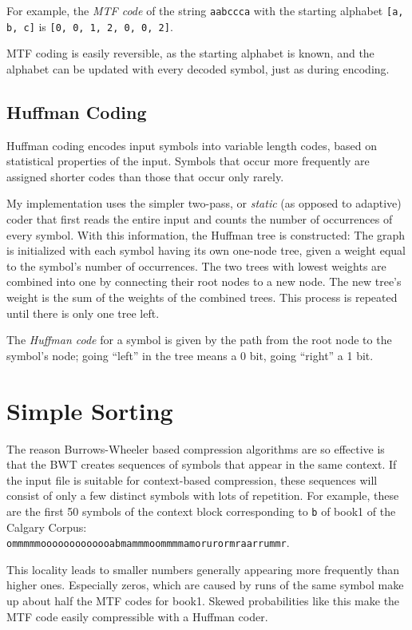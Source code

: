 \documentclass[a4paper]{scrreprt}
\begin{document}
For example, the \emph{MTF code} of the string \texttt{aabccca} with the
starting alphabet \texttt{[a, b, c]} is \texttt{[0, 0, 1, 2, 0, 0, 2]}.

MTF coding is easily reversible, as the starting alphabet is known, and the
alphabet can be updated with every decoded symbol, just as during encoding.

\section{Huffman Coding}

Huffman coding encodes input symbols into variable length codes, based on
statistical properties of the input. Symbols that occur more frequently are
assigned shorter codes than those that occur only rarely.

My implementation uses the simpler two-pass, or \emph{static} (as opposed
to adaptive) coder that first reads the entire input and counts the number of
occurrences of every symbol. With this information, the Huffman tree is
constructed: The graph is initialized with each symbol having its own one-node
tree, given a weight equal to the symbol's number of occurrences. The two trees
with lowest weights are combined into one by connecting their root nodes to a
new node. The new tree's weight is the sum of the weights of the combined trees.
This process is repeated until there is only one tree left.

The \emph{Huffman code} for a symbol is given by the path from the root node to
the symbol's node; going ``left'' in the tree means a 0 bit, going ``right'' a 1
bit.

\chapter{Simple Sorting}

The reason Burrows-Wheeler based compression algorithms are so effective is that
the BWT creates sequences of symbols that appear in the same context. If the
input file is suitable for context-based compression, these sequences will
consist of only a few distinct symbols with lots of repetition. For example,
these are the first 50 symbols of the context block corresponding to \texttt{b}
of book1 of the Calgary Corpus:\\
\texttt{ommmmmooooooooooooabmammmoommmmamorurormraarrummr}.

This locality leads to smaller numbers generally appearing more frequently than
higher ones. Especially zeros, which are caused by runs of the same symbol make
up about half the MTF codes for book1. Skewed probabilities like this make the
MTF code easily compressible with a Huffman coder.
\end{document}
